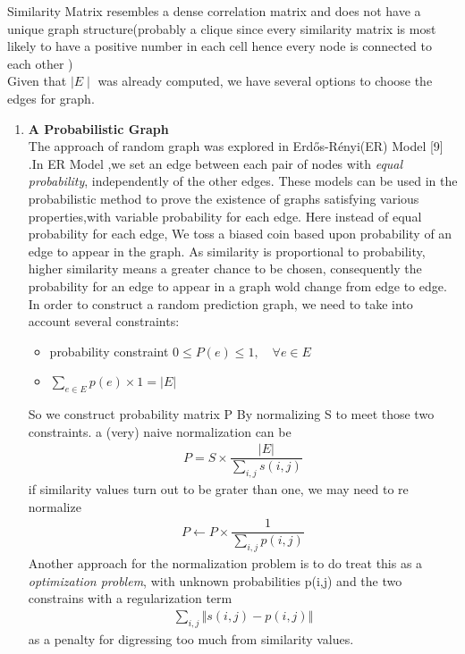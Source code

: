 \documentclass[a4paper]{article}
\begin{document}
Similarity Matrix resembles a dense correlation matrix and does not have a unique graph structure(probably a clique since every similarity matrix is most likely to have a positive number in each cell hence every node is connected  to each other )\\
Given that $\mid E \mid$ was already computed, we have several options to choose the edges for graph.
\begin{enumerate}
\item \textbf{ A Probabilistic Graph}\\
The approach of random graph was explored in  Erd\H{o}s-R\'enyi(ER) Model [9] .In ER  Model ,we set an edge between each pair of nodes with \emph{equal probability}, independently of the other edges. These models can be used in the probabilistic method to prove the existence of graphs satisfying various properties,with variable probability for each edge.
Here instead of equal probability for each edge,
We toss a biased coin based upon probability of an edge to appear in the graph.
As similarity is proportional to probability, higher similarity means a greater chance to be chosen, consequently the  probability for an edge to appear in a graph wold change from edge to edge.
In order to construct a random prediction graph, we  need to take into account several constraints:
\begin{itemize}
\item probability constraint $0\leq P(e)\leq 1,\quad \forall e\in E$
\item $\sum\limits_{e\in E} p(e)\times 1 = | E |$
\end{itemize}
So we construct probability matrix P By normalizing S to meet those two constraints.
a (very) naive normalization can be
\begin{align*}
P = S\times \dfrac{|E|}{\sum\limits_{i,j} s(i,j)}
\end{align*}
if similarity values turn out to be grater than one, we may need to re normalize
\begin{align*}
P \leftarrow	 P\times \dfrac{1}{\sum\limits_{i,j} p(i,j)}
\end{align*}
Another approach for the normalization problem is to do treat this as a  \emph{optimization problem}, with 
unknown probabilities p(i,j) and  the two constrains with a regularization term\begin{align*}
 \sum\limits_{i,j} \Vert s(i,j)-p(i,j)\Vert
\end{align*} as a penalty for digressing too much from similarity values.\\

\end{enumerate}
\end{document}
